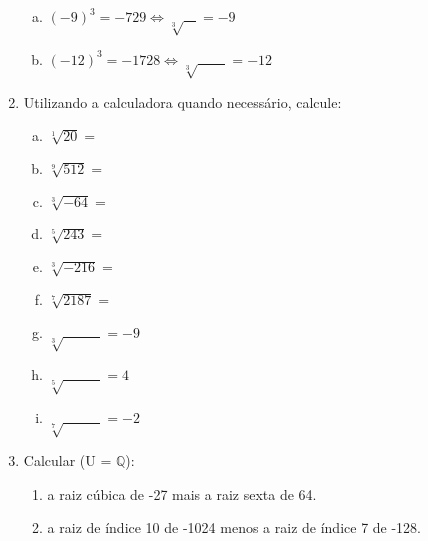 \documentclass[a4paper,14pt]{article}
\begin{document}
\begin{multicols}{2}
\begin{enumerate}
\begin{enumerate}[a)]
        	\item $(-9)^3 = -729 \Leftrightarrow \sqrt[3]{~~~~} = -9$
        	\item $(-12)^3 = -1728 \Leftrightarrow \sqrt[3]{~~~~~~~~~} = -12$
        \end{enumerate}
        \item Utilizando a calculadora quando necessário, calcule:
        \begin{enumerate}[a)]
        	\item $\sqrt[1]{20} = $
        	\item $\sqrt[9]{512} = $
        	\item $\sqrt[3]{-64} = $
        	\item $\sqrt[5]{243} = $
        	\item $\sqrt[3]{-216} = $
        	\item $\sqrt[7]{2187} = $
        	\item $\sqrt[3]{~~~~~~~~~~~~} = -9$
        	\item $\sqrt[5]{~~~~~~~~~~~~} = 4$
        	\item $\sqrt[7]{~~~~~~~~~~~~} = -2$
        \end{enumerate}
        \item Calcular (U = $\mathbb{Q}$):
        \begin{enumerate}
           	\item a raiz cúbica de -27 mais a raiz sexta de 64.
           	\vspace{8cm}
           	\item a raiz de índice 10 de -1024 menos a raiz de índice 7 de -128.
        \end{enumerate}
        
        
    \end{enumerate}        
    \end{multicols}    
\end{document}
